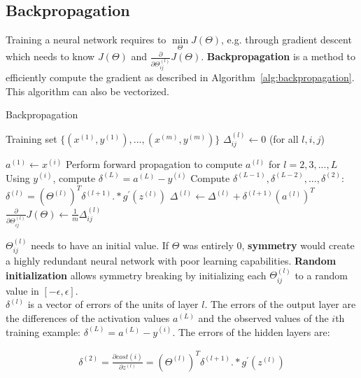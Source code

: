 \documentclass{report}
\begin{document}
\subsection{Backpropagation}
Training a neural network requires to $\min\limits_{\Theta}J(\Theta)$, e.g. through gradient descent which needs to know $J(\Theta)$ and $\frac{\partial}{\partial \Theta_{ij}^{(l)}}J(\Theta)$.
{\bf Backpropagation} is a method to efficiently compute the gradient as described in Algorithm~\ref{alg:backpropagation}. This algorithm can also be vectorized.

\begin{algorithm}[h!]
\caption{Backpropagation}
\label{alg:backpropagation}
\begin{algorithmic}
\State Training set $\{(x^{(1)},y^{(1)}),...,(x^{(m)},y^{(m)})\}$
\State $\Delta_{ij}^{(l)} \gets 0$ (for all $l,i,j$)

\State $a^{(1)} \gets x^{(i)}$
\State Perform forward propagation to compute $a^{(l)}$ for $l=2,3,...,L$
\State Using $y^{(i)}$, compute $\delta^{(L)}=a^{(L)}-y^{(i)}$ 
\State Compute $\delta^{(L-1)},\delta^{(L-2)},...,\delta^{(2)}$: $\delta^{(l)}=(\Theta^{(l)})^T\delta^{(l+1)}.*g^{'}(z^{(l)})$
\State $\Delta^{(l)} \gets \Delta^{(l)}+\delta^{(l+1)}(a^{(l)})^T$  
\EndFor
\State $\frac{\partial}{\partial \Theta_{ij}^{(l)}}J(\Theta) \gets \frac{1}{m}\Delta_{ij}^{(l)}$

\end{algorithmic}
\end{algorithm}

$\Theta_{ij}^{(l)}$ needs to have an initial value. If $\Theta$ was entirely 0, {\bf symmetry} would create a highly redundant neural network with poor learning capabilities.
{\bf Random initialization} allows symmetry breaking by initializing each $\Theta_{ij}^{(l)}$ to a random value in $[-\epsilon,\epsilon]$. \\

$\delta^{(l)}$ is a vector of errors of the units of layer $l$.
The errors of the output layer are the differences of the activation values $a^{(L)}$ and the observed values of the $i$th training example: $\delta^{(L)}=a^{(L)}-y^{(i)}$.
The errors of the hidden layers are: 

\begin{align*}
\delta^{(2)} = \frac{\partial cost(i)}{\partial z^{(l)}} =(\Theta^{(l)})^T\delta^{(l+1)}.*g^{'}(z^{(l)})
\end{align*}
\end{document}
